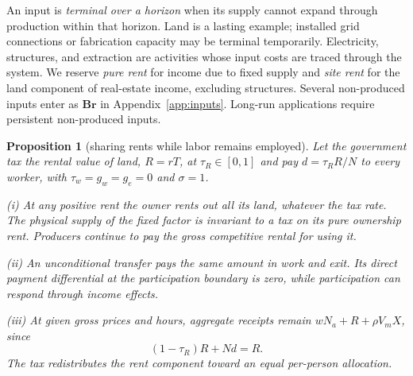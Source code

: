 \documentclass[12pt]{article}
\theoremstyle{plain}
\newtheorem{proposition}{Proposition}
\theoremstyle{definition}
\theoremstyle{remark}
\begin{document}
An input is \emph{terminal over a horizon} when its supply cannot expand through production within that horizon. Land is a lasting example; installed grid connections or fabrication capacity may be terminal temporarily. Electricity, structures, and extraction are activities whose input costs are traced through the system. We reserve \emph{pure rent}
for income due to fixed supply and \emph{site rent} for the land component of
real-estate income, excluding structures. Several non-produced inputs enter as $\mathbf{B}\mathbf{r}$ in Appendix~\ref{app:inputs}. Long-run applications require persistent non-produced inputs.

\begin{proposition}[sharing rents while labor remains employed]\label{prop:6}
Let the government tax the rental value of land, $R=rT$, at $\tau_R\in[0,1]$ and pay $d=\tau_RR/N$ to every worker, with $\tau_w=g_w=g_e=0$ and $\sigma=1$.

(i) At any positive rent the owner rents out all its land, whatever the tax rate. The physical supply of the fixed factor is invariant to a tax on its pure ownership rent. Producers continue to pay the gross competitive rental for using it.

(ii) An unconditional transfer pays the same amount in work and exit. Its direct payment differential at the participation boundary is zero, while participation can respond through income effects.

(iii) At given gross prices and hours, aggregate receipts remain $wN_a+R+\rho V_mX$, since
\[
(1-\tau_R)R+Nd=R.
\]
The tax redistributes the rent component toward an equal per-person allocation.
\end{proposition}
\end{document}
